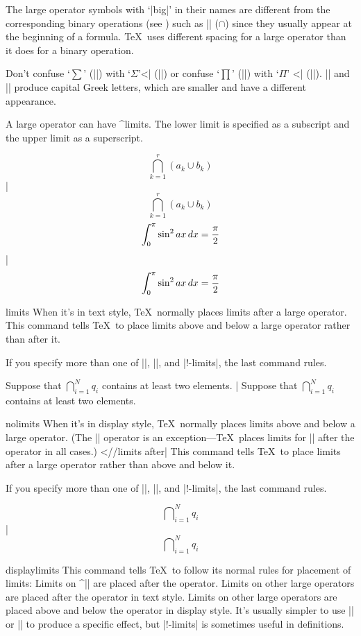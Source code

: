 The large operator symbols with `|big|' in their names are different
from the corresponding binary operations (see ) such as
|\cap| ($\cap$) since they usually appear at the beginning
of a formula.  \TeX\ uses different spacing for a large operator
than it does for a binary operation.

Don't confuse `$\sum$' (|\sum|) with `$\Sigma$'^^|\Sigma| (|\Sigma|)
or confuse `$\prod$' (|\prod|) with `$\Pi$' ^^|\Pi| (|\Pi|).
|\Sigma| and |\Pi| produce capital Greek letters, which are smaller and
have a different appearance.

A large operator can have ^{limits}.  The lower limit is specified as a
subscript and the upper limit as a superscript.

\example
$$\bigcap_{k=1}^r (a_k \cup b_k)$$
|
\dproduces
$$\bigcap_{k=1}^r (a_k \cup b_k)$$
\endexample
\interexampleskip
\example
$${\int_0^\pi \sin^2 ax\,dx} = {\pi \over 2}$$
|
\dproduces
$${\int_0^\pi \sin^2 ax\,dx} = {\pi \over 2}$$
\endexample
\enddesc

\begindesc
\cts limits {}
\explain
When it's in text style, \TeX\ normally places limits after a large operator.
This command tells \TeX\ to place
limits above and below a large operator rather than after it.

If you specify more than one of |\limits|, |\nolimits|,
and |\display!-limits|, the last command rules.

\example
Suppose that $\bigcap\limits_{i=1}^Nq_i$ contains at least
two elements.
|
\produces
Suppose that $\bigcap\limits_{i=1}^Nq_i$ contains at least
two elements.
\endexample
\enddesc

\begindesc
\cts nolimits {}
\explain
When it's in display
style, \TeX\ normally places limits above and below a large operator.
(The |\int| operator is an exception---\TeX\
places limits for |\int| after the operator in all cases.)
^^|\int//limits after|
This command tells \TeX\ to place
limits after a large operator rather than above and below it.

If you specify more than one of |\limits|, |\nolimits|,
and |\display!-limits|, the last command rules.

\example
$$\bigcap\nolimits_{i=1}^Nq_i$$
|
\dproduces
$$\bigcap\nolimits_{i=1}^Nq_i$$
\endexample
\enddesc

\begindesc
\cts displaylimits {}
\explain
This command tells \TeX\ to
follow its normal rules for placement of limits:
\olist\compact
\li Limits on ^|\int| are placed after the operator.
\li Limits on other large operators are placed after the
operator in text style.
\li Limits on other large operators are placed above and below the operator
in display style.
\endolist
It's usually simpler to use |\limits| or |\nolimits|
to produce a specific effect, but |\display!-limits| is sometimes
useful in \minref{macro} definitions.

